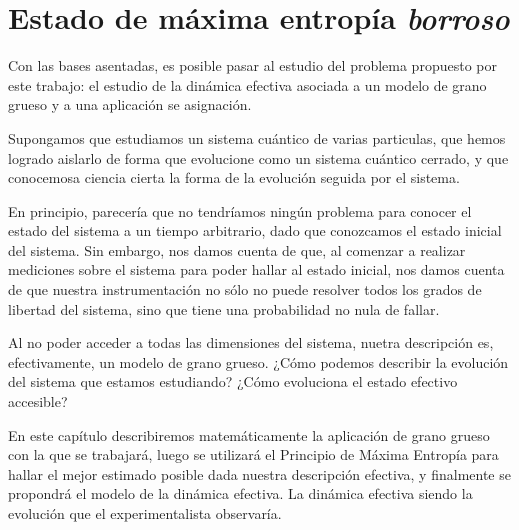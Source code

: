 \chapter{Estado de máxima entropía \textit{borroso}}

Con las bases asentadas, es posible pasar al estudio del problema propuesto por este trabajo: el estudio de la dinámica efectiva asociada a un modelo de grano grueso y a una aplicación se asignación.

Supongamos que estudiamos un sistema cuántico de varias particulas, que hemos logrado aislarlo de forma que evolucione como un sistema cuántico cerrado, y que conocemosa ciencia cierta la forma de la evolución seguida por el sistema.

En principio, parecería que no tendríamos ningún problema para conocer el estado del sistema a un tiempo arbitrario, dado que conozcamos el estado inicial del sistema. Sin embargo, nos damos cuenta de que, al comenzar a realizar mediciones sobre el sistema para poder hallar al estado inicial, nos damos cuenta de que nuestra instrumentación no sólo no puede resolver todos los grados de libertad del sistema, sino que tiene una probabilidad no nula de fallar.

Al no poder acceder a todas las dimensiones del sistema, nuetra descripción es, efectivamente, un modelo de grano grueso. ¿Cómo podemos describir la evolución del sistema que estamos estudiando? ¿Cómo evoluciona el estado efectivo accesible?

En este capítulo describiremos matemáticamente la aplicación de grano grueso con la que se trabajará, luego se utilizará el Principio de Máxima Entropía para hallar el mejor estimado posible dada nuestra descripción efectiva, y finalmente se propondrá el modelo de la dinámica efectiva. La dinámica efectiva siendo la evolución que el experimentalista observaría.






\newpage
